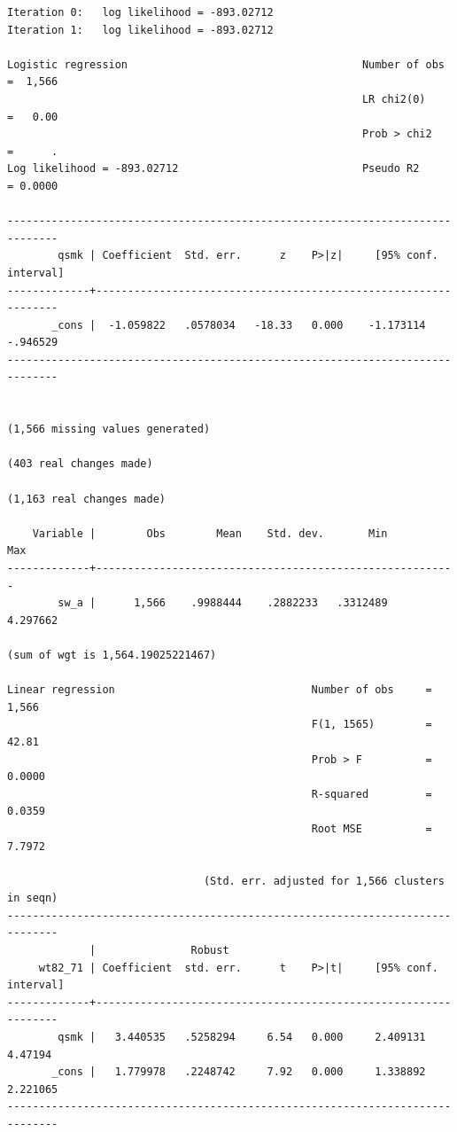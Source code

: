 \documentclass[
  10pt,
  a4paper,
]{book}
\begin{document}
\begin{verbatim}
Iteration 0:   log likelihood = -893.02712  
Iteration 1:   log likelihood = -893.02712  

Logistic regression                                     Number of obs =  1,566
                                                        LR chi2(0)    =   0.00
                                                        Prob > chi2   =      .
Log likelihood = -893.02712                             Pseudo R2     = 0.0000

------------------------------------------------------------------------------
        qsmk | Coefficient  Std. err.      z    P>|z|     [95% conf. interval]
-------------+----------------------------------------------------------------
       _cons |  -1.059822   .0578034   -18.33   0.000    -1.173114    -.946529
------------------------------------------------------------------------------


(1,566 missing values generated)

(403 real changes made)

(1,163 real changes made)

    Variable |        Obs        Mean    Std. dev.       Min        Max
-------------+---------------------------------------------------------
        sw_a |      1,566    .9988444    .2882233   .3312489   4.297662

(sum of wgt is 1,564.19025221467)

Linear regression                               Number of obs     =      1,566
                                                F(1, 1565)        =      42.81
                                                Prob > F          =     0.0000
                                                R-squared         =     0.0359
                                                Root MSE          =     7.7972

                               (Std. err. adjusted for 1,566 clusters in seqn)
------------------------------------------------------------------------------
             |               Robust
     wt82_71 | Coefficient  std. err.      t    P>|t|     [95% conf. interval]
-------------+----------------------------------------------------------------
        qsmk |   3.440535   .5258294     6.54   0.000     2.409131     4.47194
       _cons |   1.779978   .2248742     7.92   0.000     1.338892    2.221065
------------------------------------------------------------------------------


\end{verbatim}
\end{document}
